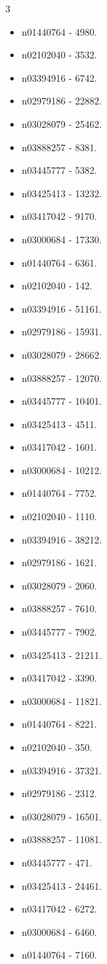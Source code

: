 \begin{multicols}{3}
\begin{itemize}
\item n01440764 - 4980.
\item n02102040 - 3532.
\item n03394916 - 6742.
\item n02979186 - 22882.
\item n03028079 - 25462.
\item n03888257 - 8381.
\item n03445777 - 5382.
\item n03425413 - 13232.
\item n03417042 - 9170.
\item n03000684 - 17330.
\item n01440764 - 6361.
\item n02102040 - 142.
\item n03394916 - 51161.
\item n02979186 - 15931.
\item n03028079 - 28662.
\item n03888257 - 12070.
\item n03445777 - 10401.
\item n03425413 - 4511.
\item n03417042 - 1601.
\item n03000684 - 10212.
\item n01440764 - 7752.
\item n02102040 - 1110.
\item n03394916 - 38212.
\item n02979186 - 1621.
\item n03028079 - 2060.
\item n03888257 - 7610.
\item n03445777 - 7902.
\item n03425413 - 21211.
\item n03417042 - 3390.
\item n03000684 - 11821.
\item n01440764 - 8221.
\item n02102040 - 350.
\item n03394916 - 37321.
\item n02979186 - 2312.
\item n03028079 - 16501.
\item n03888257 - 11081.
\item n03445777 - 471.
\item n03425413 - 24461.
\item n03417042 - 6272.
\item n03000684 - 6460.
\item n01440764 - 7160.

\end{itemize}
\end{multicols}
